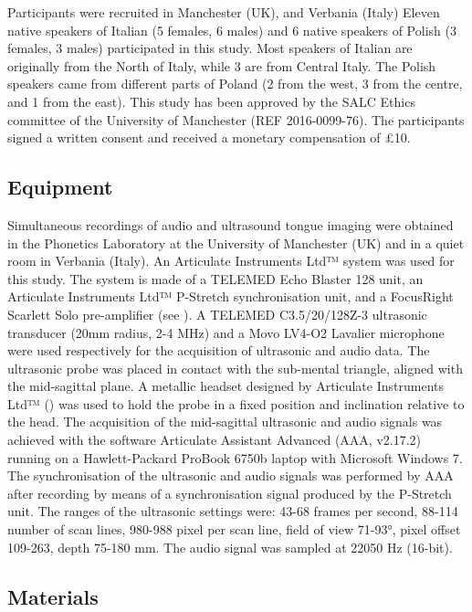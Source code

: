 \documentclass[12pt,]{article}
\begin{document}
Participants were recruited in Manchester (UK), and Verbania (Italy)
Eleven native speakers of Italian (5 females, 6 males) and 6 native
speakers of Polish (3 females, 3 males) participated in this study. Most
speakers of Italian are originally from the North of Italy, while 3 are
from Central Italy. The Polish speakers came from different parts of
Poland (2 from the west, 3 from the centre, and 1 from the east). This
study has been approved by the SALC Ethics committee of the University
of Manchester (REF 2016-0099-76). The participants signed a written
consent and received a monetary compensation of £10.

\hypertarget{equipment}{%
\subsection{Equipment}\label{equipment}}

\label{s:equipment}

Simultaneous recordings of audio and ultrasound tongue imaging were
obtained in the Phonetics Laboratory at the University of Manchester
(UK) and in a quiet room in Verbania (Italy). An Articulate Instruments
Ltd™ system was used for this study. The system is made of a TELEMED
Echo Blaster 128 unit, an Articulate Instruments Ltd™ P-Stretch
synchronisation unit, and a FocusRight Scarlett Solo pre-amplifier (see
). A TELEMED C3.5/20/128Z-3 ultrasonic transducer
(20mm radius, 2-4 MHz) and a Movo LV4-O2 Lavalier microphone were used
respectively for the acquisition of ultrasonic and audio data. The
ultrasonic probe was placed in contact with the sub-mental triangle,
aligned with the mid-sagittal plane. A metallic headset designed by
Articulate Instruments Ltd™ (\citeyear{articulate2008}) was used to hold
the probe in a fixed position and inclination relative to the head. The
acquisition of the mid-sagittal ultrasonic and audio signals was
achieved with the software Articulate Assistant Advanced (AAA, v2.17.2)
running on a Hawlett-Packard ProBook 6750b laptop with Microsoft Windows
7. The synchronisation of the ultrasonic and audio signals was performed
by AAA after recording by means of a synchronisation signal produced by
the P-Stretch unit. The ranges of the ultrasonic settings were: 43-68
frames per second, 88-114 number of scan lines, 980-988 pixel per scan
line, field of view 71-93°, pixel offset 109-263, depth 75-180 mm. The
audio signal was sampled at 22050 Hz (16-bit).

\hypertarget{materials}{%
\subsection{Materials}\label{materials}}
\end{document}
